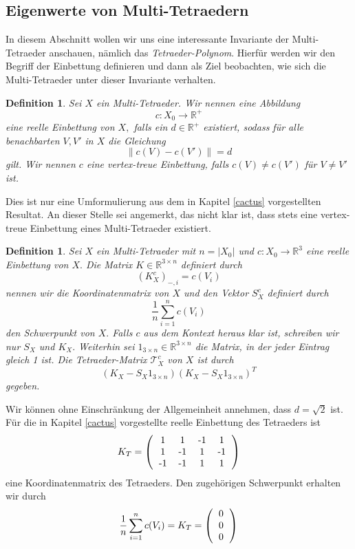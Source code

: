 \documentclass[12pt,titlepage,twoside,cleardoublepage]{article}
\theoremstyle{nummermitklammern}
\newtheorem{definition}[temp]{Definition}
\newtheorem{definition}[zahl]{Definition}
\numberwithin{equation}{section}
\begin{document}
\subsection{Eigenwerte von Multi-Tetraedern}\label{eigenwerte}
In diesem Abschnitt wollen wir uns eine interessante Invariante der Multi-Tetraeder anschauen, nämlich das \emph{Tetraeder-Polynom}. Hierfür werden wir den Begriff der Einbettung definieren und dann als Ziel beobachten, wie sich die Multi-Tetraeder unter dieser Invariante verhalten.
\begin{definition}
Sei $X$ ein Multi-Tetraeder. Wir nennen eine Abbildung 
\[
c:X_0\to \mathbb{R}^+
\]
eine reelle Einbettung von $X,$ falls ein $d\in \mathbb{R}^+$ existiert, sodass für alle benachbarten $V,V'$ in $X$ die Gleichung
\[
\| c(V)-c(V')\|=d
\] 
gilt. Wir nennen $c$ eine vertex-treue Einbettung, falls $c(V)\neq c(V')$ für $V\neq V'$ ist.
\end{definition}
Dies ist nur eine Umformulierung aus dem in Kapitel \ref{cactus} vorgestellten Resultat. An dieser Stelle sei angemerkt, das nicht klar ist, dass stets eine vertex-treue Einbettung eines Multi-Tetraeder existiert.
\begin{definition}
Sei $X$ ein Multi-Tetraeder mit $n=\vert X_0\vert $ und $c:X_0\to \mathbb{R}^3$ eine reelle Einbettung von $X.$ Die Matrix $K\in \mathbb{R}^{3\times n}$ definiert durch
\[
(K^c_X)_{-,i}=c(V_i)
\] 
nennen wir die Koordinatenmatrix von $X$ und den Vektor $S^c_X$ definiert durch 
\[
\frac{1}{n}\sum_{i=1}^nc(V_i)
\] den Schwerpunkt von $X.$
Falls $c$ aus dem Kontext heraus klar ist, schreiben wir nur $S_X$ und $K_X.$
Weiterhin sei $1_{3\times n}\in \mathbb{R}^{3\times n}$ die Matrix, in der jeder Eintrag gleich 1 ist. Die \emph{Tetraeder-Matrix} $\mathcal{T}^c_X$ von $X$ ist durch
\[
(K_X-S_X1_{3\times n})(K_X-S_X1_{3\times n})^T
\] 
gegeben. 
\end{definition} 
Wir können ohne Einschränkung der Allgemeinheit annehmen, dass $d=\sqrt{2}$ ist. 
Für die in Kapitel \ref{cactus} vorgestellte reelle  Einbettung des Tetraeders ist
\[
K_T=\left(\begin{tabular}{cccc}
1&1&-1&1\\
1&-1&1&-1\\
-1&-1&1&1\\
\end{tabular}\right)
\] 
eine Koordinatenmatrix des Tetraeders.
Den zugehörigen Schwerpunkt erhalten wir durch 
\[
\frac{1}{n}\sum_{i=1}^nc(V_i)=
K_T=\left(\begin{tabular}{c}
0\\
0\\
0\\
\end{tabular}\right)
\]
\end{document}
